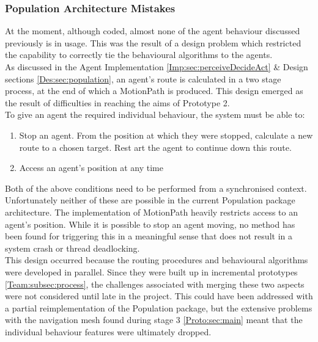 \subsubsection{Population Architecture Mistakes } %
At the moment, although coded, almost none of the agent behaviour discussed previously is in usage. This was the result of a design problem which restricted the capability to correctly tie the behavioural algorithms to the agents.\\
As discussed in the Agent Implementation \ref{Imp:sec:perceiveDecideAct} \& Design sections \ref{Des:sec:population}, an agent's route is calculated in a two stage process, at the end of which a MotionPath is produced. This design emerged as the result of difficulties in reaching the aims of Prototype 2.\\
To give an agent the required individual behaviour, the system must be able to:
\begin{enumerate}
\item{Stop an agent. From the position at which they were stopped, calculate a new route to a chosen target. Rest art the agent to continue down this route.}
\item{Access an agent's position at any time}
\end{enumerate}
Both of the above conditions need to be performed from a synchronised context. Unfortunately neither of these are possible in the current Population package architecture. The implementation of MotionPath heavily restricts access to an agent's position. While it is possible to stop an agent moving, no method has been found for triggering this in a meaningful sense that does not result in a system crash or thread deadlocking.\\
This design occurred because the routing procedures and behavioural algorithms were developed in parallel. Since they were built up in incremental prototypes \ref{Team:subsec:process}, the challenges associated with merging these two aspects were not considered until late in the project. This could have been addressed with a partial reimplementation of the Population package, but the extensive problems with the navigation mesh found during stage 3 \ref{Proto:sec:main} meant that the individual behaviour features were ultimately dropped.\\














